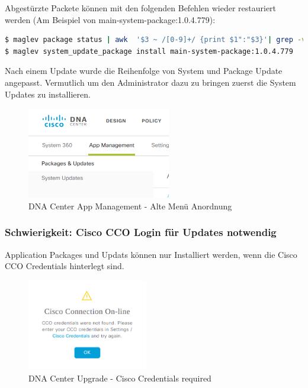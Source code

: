 Abgestürzte Packete können mit den folgenden Befehlen wieder restauriert werden (Am Beispiel von main-system-package:1.0.4.779):

\begin{lstlisting}[language=bash]
$ maglev package status | awk  '$3 ~ /[0-9]+/ {print $1":"$3}'| grep -v "^system" |  while read pkg; do maglev catalog package delete $pkg;done
$ maglev system_update_package install main-system-package:1.0.4.779
\end{lstlisting}

Nach einem Update wurde die Reihenfolge von System und Package Update angepasst. Vermutlich um den Administrator dazu zu bringen zuerst die System Updates zu installieren. 

\begin{figure}[H]
	\centering
	\includegraphics[height=4cm]{img/sc_010.png}
	\caption{DNA Center App Management - Alte Menü Anordnung}
	\label{fig:dna-center-gui-update-2}
\end{figure}

\subsubsection{Schwierigkeit: Cisco CCO Login für Updates notwendig}

Application Packages und Updats können nur Installiert werden, wenn die Cisco CCO Credentials hinterlegt sind.

\begin{figure}[H]
	\centering
	\includegraphics[height=4cm]{img/dan-center-cisco-credentials-required.png}
	\caption{DNA Center Upgrade - Cisco Credentials required}
	\label{fig:dna-center-cisco-credentials-required}
\end{figure}

